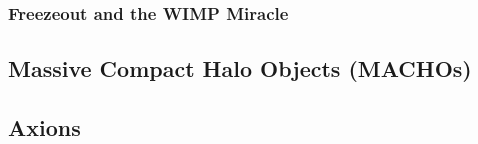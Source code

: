 
\subsubsection{Freezeout and the WIMP Miracle}


\subsection{Massive Compact Halo Objects (MACHOs)}


\subsection{Axions}


